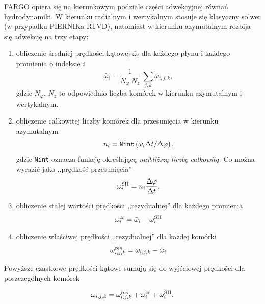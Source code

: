 \par FARGO opiera się na kierunkowym podziale części adwekcyjnej równań
hydrodynamiki. W kierunku radialnym i wertykalnym stosuje się klasyczny solwer
(w przypadku PIERNIKa RTVD), natomiast w kierunku azymutalnym rozbija się
adwekcję na trzy etapy:
\begin{enumerate}
   \item obliczenie średniej prędkości kątowej $\bar{\omega}_i$ dla każdego
      płynu i każdego promienia o indeksie $i$
      \begin{equation}
         \bar{\omega}_i = \frac{1}{N_\varphi~N_z} ~ \sum_{j,k} \omega_{i,j,k},
      \end{equation}
      gdzie $N_\varphi,\,N_z$ to odpowiednio liczba komórek w kierunku
      azymutalnym i wertykalnym.

   \item  obliczenie całkowitej liczby komórek dla przesunięcia w kierunku
      azymutalnym
      \begin{equation}
         n_i = {\tt Nint} \left( \bar{\omega}_i \Delta t/\Delta \varphi \right),
      \end{equation}
      gdzie {\tt Nint} oznacza funkcję określającą \emph{najbliższą liczbę
      całkowitą}. Co można wyrazić jako ,,prędkość przesunięcia''
      \begin{equation}
         \omega_i^{\rm SH} = n_i \frac{\Delta \varphi}{\Delta t}.
      \end{equation}
   \item obliczenie stałej wartości prędkości ,,rezydualnej'' dla każdego
      promienia
      \begin{equation}
         \omega_i^{\rm cr}= \bar{\omega}_i - \omega_i^{\rm SH}
      \end{equation}
   \item obliczenie właściwej prędkości ,,rezydualnej'' dla każdej komórki
      \begin{equation}
         \omega_{i,j,k}^{\rm res} = \omega_{i,j,k} - \bar{\omega}_i
      \end{equation}
\end{enumerate}

Powyższe cząstkowe prędkości kątowe sumują się do wyjściowej prędkości dla
poszczególnych komórek

\begin{equation}
   \omega_{i,j,k} = \omega_{i,j,k}^{\rm res} + \omega_i^{\rm cr} + \omega_i^{\rm SH}.  
\end{equation}

